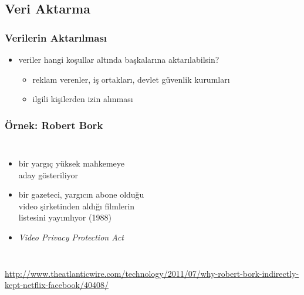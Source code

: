 \documentclass[dvipsnames]{beamer}
\theoremstyle{definition}
\theoremstyle{example}
\theoremstyle{plain}
\begin{document}
\subsection{Veri Aktarma}

\begin{frame}
  \frametitle{Verilerin Aktarılması}

  \begin{itemize}
    \item veriler hangi koşullar altında başkalarına aktarılabilsin?
    \begin{itemize}
      \item reklam verenler, iş ortakları, devlet güvenlik kurumları
      \item ilgili kişilerden izin alınması
    \end{itemize}
  \end{itemize}
\end{frame}

\begin{frame}
  \frametitle{Örnek: Robert Bork}

  \begin{columns}

    \begin{itemize}
      \item bir yargıç yüksek mahkemeye\\
        aday gösteriliyor
      \item bir gazeteci, yargıcın abone olduğu\\
        video şirketinden aldığı filmlerin\\
        listesini yayımlıyor (1988)

      \pause
      \medskip
      \item \emph{Video Privacy Protection Act}
    \end{itemize}
  \end{columns}

  \medskip
  \tiny{\url{http://www.theatlanticwire.com/technology/2011/07/why-robert-bork-indirectly-kept-netflix-facebook/40408/}}\\
\end{frame}
\end{document}

